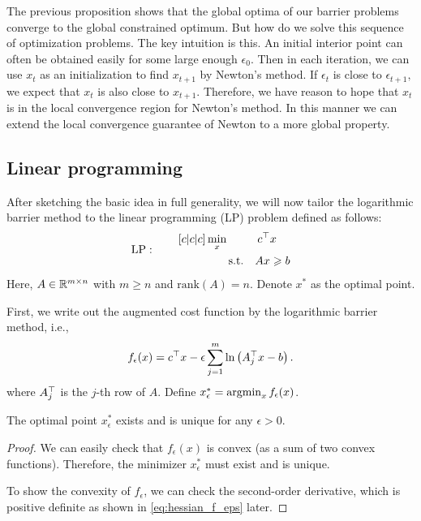 The previous proposition shows that the global optima of our barrier problems
converge to the global constrained optimum. But how do we solve this sequence of
optimization problems.  The key intuition is this.  An initial interior point
can often be obtained easily for some large enough $\epsilon_0$.  Then in each
iteration, we can use $x_t$ as an initialization to find $x_{t+1}$ by Newton's
method. If $\epsilon_t$ is close to $\epsilon_{t+1},$ we expect that $x_t$ is
also close to $x_{t+1}$. Therefore, we have reason to hope that $x_t$ is in the
local convergence region for Newton's method. In this manner we can extend the
local convergence guarantee of Newton to a more global property.

\subsection{Linear programming}

After sketching the basic idea in full generality, we will now tailor the
logarithmic barrier method to the linear programming (LP) problem defined as
follows:
\begin{equation}
\label{eq:LP_def}
\text{LP}:\qquad
\begin{aligned}[c|c|c]
&\min_x &c^\trans&x\\
&\qquad\text{s.t.} &Ax&\ge b
\end{aligned}
\end{equation}
Here, $A\in{\mathbb{R}}^{m\times n}$ with $m\ge n$ and $\mathrm{rank}(A)=n$. 
Denote $x^*$ as the optimal point. 

First, we write out the augmented cost function by the logarithmic barrier method, i.e.,
\begin{equation}
\label{eq:LP_aug_cost}
f_\epsilon(x) = c^\top x-\epsilon \sum_{j=1}^m\ln\left(A^\top_j x-b\right).
\end{equation}
where $A^\top_j$ is the $j$-th row of $A$. Define $x^*_\epsilon=\mathop{\rm argmin}_x f_\epsilon(x)$. 

\begin{fact}
The optimal point $x^*_\epsilon$ exists and is unique for any $\epsilon>0$.
\end{fact}
\begin{proof}
We can easily check that $f_\epsilon(x)$ is convex (as a sum of two convex functions). Therefore, the minimizer $x^*_\epsilon$ must exist and is unique.

To show the convexity of $f_\epsilon$, we can check the second-order derivative,
which is positive definite as shown in \eqref{eq:hessian_f_eps} later.
\end{proof}

